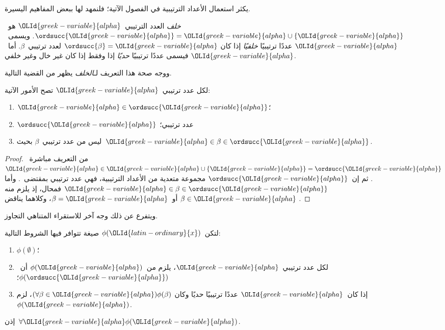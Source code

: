 \documentclass[../../../include/open-logic-section]{subfiles}
\begin{document}

يكثر استعمال الأعداد الترتيبية في الفصول الآتية؛ فلنمهد لها ببعض
المفاهيم اليسيرة.

\begin{defn}
\emph{خلف} العدد الترتيبي~${\OLId{greek-variable}{alpha}}$ هو~$\ordsucc{{\OLId{greek-variable}{alpha}}} ={\OLId{greek-variable}{alpha}} \cup \{{\OLId{greek-variable}{alpha}}\}$.
ويسمى~${\OLId{greek-variable}{alpha}}$ عددًا ترتيبيًا \emph{خلفيًا} إذا كان
$\ordsucc{\beta} = {\OLId{greek-variable}{alpha}}$ لعدد ترتيبي~$\beta$. أما~${\OLId{greek-variable}{alpha}}$ فيسمى
عددًا ترتيبيًا \emph{حديًا} إذا وفقط إذا كان غير خال وغير خلفي.
\end{defn}
\noindent
ووجه صحة هذا التعريف لـ\emph{الخلف} يظهر من القضية التالية.

\begin{prop}
لكل عدد ترتيبي~${\OLId{greek-variable}{alpha}}$ تصح الأمور الآتية:
\begin{enumerate}
\item ${\OLId{greek-variable}{alpha}} \in \ordsucc{{\OLId{greek-variable}{alpha}}}$؛
\item $\ordsucc{{\OLId{greek-variable}{alpha}}}$ عدد ترتيبي؛
\item ليس من عدد ترتيبي~$\beta$ بحيث~${\OLId{greek-variable}{alpha}} \in \beta \in \ordsucc{{\OLId{greek-variable}{alpha}}}$.
\end{enumerate}
\end{prop}

\begin{proof}
من التعريف مباشرة~${\OLId{greek-variable}{alpha}} \in {\OLId{greek-variable}{alpha}} \cup \{{\OLId{greek-variable}{alpha}}\} = \ordsucc{{\OLId{greek-variable}{alpha}}}$.
ثم إن~$\ordsucc{{\OLId{greek-variable}{alpha}}}$ مجموعة متعدية من الأعداد الترتيبية، فهي
عدد ترتيبي بمقتضى~. وأما
${\OLId{greek-variable}{alpha}} \in \beta \in \ordsucc{{\OLId{greek-variable}{alpha}}}$ فمحال، إذ يلزم منه
$\beta \in {\OLId{greek-variable}{alpha}}$ أو~$\beta = {\OLId{greek-variable}{alpha}}$، وكلاهما يناقض
.
\end{proof}
\noindent
ويتفرع عن ذلك وجه آخر للاستقراء المتناهي التجاوز.

\begin{thm}
لتكن~$\phi({\OLId{latin-ordinary}{x}})$ صيغة تتوافر فيها الشروط التالية:
\begin{enumerate}
\item $\phi(\emptyset)$؛
\item لكل عدد ترتيبي~${\OLId{greek-variable}{alpha}}$، يلزم من~$\phi({\OLId{greek-variable}{alpha}})$ أن~$\phi(\ordsucc{{\OLId{greek-variable}{alpha}}})$؛
\item إذا كان~${\OLId{greek-variable}{alpha}}$ عددًا ترتيبيًا حديًا وكان
$(\forall \beta \in {\OLId{greek-variable}{alpha}})\phi(\beta)$، لزم~$\phi({\OLId{greek-variable}{alpha}})$.
\end{enumerate}
إذن~$\forall {\OLId{greek-variable}{alpha}} \phi({\OLId{greek-variable}{alpha}})$.
\end{thm}
\end{document}
